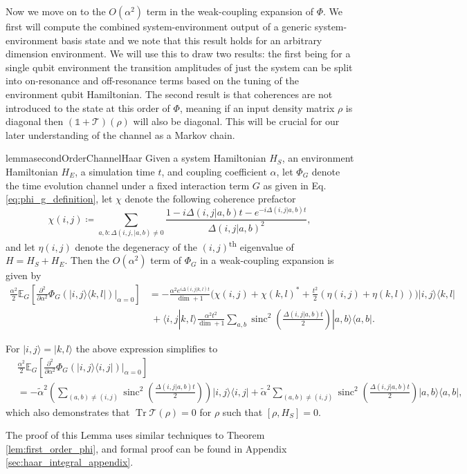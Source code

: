 \documentclass{article}
\newcommand{\ket}[1]{|#1\rangle}
\newcommand{\braket}[2]{\langle #1|#2\rangle}
\newcommand{\ketbra}[2]{| #1\rangle\! \langle #2|}
\newcommand{\ts}{\textsuperscript}
\DeclareMathOperator{\Tr}{Tr}
\newcommand{\identity}{\mathds{1}}
\DeclareMathOperator{\sinc}{sinc}
\begin{document}
Now we move on to the $O(\alpha^2)$ term in the weak-coupling expansion of $\Phi$. We first will compute the combined system-environment output of a generic system-environment basis state and we note that this result holds for an arbitrary dimension environment. We will use this to draw two results:  the first being for a single qubit environment the transition amplitudes of just the system can be split into on-resonance and off-resonance terms based on the tuning of the environment qubit Hamiltonian. The second result is that coherences are not introduced to the state at this order of $\Phi$, meaning if an input density matrix $\rho$ is diagonal then $(\identity + \mathcal{T})(\rho)$ will also be diagonal. This will be crucial for our later understanding of the channel as a Markov chain.
\begin{restatable}{lemma}{secondOrderChannelHaar} \label{lem:big_one}
    Given a system Hamiltonian $H_{S}$, an environment Hamiltonian $H_{E}$, a simulation time $t$, and coupling coefficient $\alpha$, let $\Phi_G$ denote the time evolution channel under a fixed interaction term $G$ as given in Eq. \eqref{eq:phi_g_definition}, let $\chi$ denote the following coherence prefactor
$$ \chi(i,j) \coloneqq \sum_{a,b: \Delta(i,j,|a,b) \neq 0} \frac{1 - i \Delta(i,j|a,b)t - e^{-i \Delta(i,j|a,b) t}}{\Delta(i,j|a,b)^2}, $$
and let $\eta(i,j)$ denote the degeneracy of the $(i,j)$\ts{th} eigenvalue of $H = H_S + H_E$. Then the $O(\alpha^2)$ term of $\Phi_G$ in a weak-coupling expansion is given by
 \begin{align}
 \frac{\alpha^2}{2} \mathbb{E}_G \left[ \frac{\partial^2}{\partial \alpha^2} \Phi_G(\ketbra{i,j}{k,l}) \big|_{\alpha = 0} \right] &= -\frac{\alpha^2  e^{i \Delta(i,j|k,l) t}}{\dim + 1} \bigg(\chi(i,j) + \chi(k,l)^*  + \frac{t^2}{2}(\eta(i,j) + \eta(k,l)) \bigg) \ketbra{i,j}{k,l} \nonumber \\
    &~ + \braket{i,j}{k,l}  \frac{\alpha^2 t^2}{\dim+1} \sum_{a,b} \sinc^2 \left( \frac{\Delta(i,j|a,b)t}{2} \right) \ketbra{a,b}{a,b}.  \label{eq:el_gigante}
 \end{align}

 For $\ket{i, j} = \ket{k, l}$ the above expression simplifies to
 \begin{align}
     &\frac{\alpha^2}{2} \mathbb{E}_G \left[ \frac{\partial^2}{\partial \alpha^2} \Phi_G(\ketbra{i,j}{i,j}) \big|_{\alpha = 0} \right] \nonumber \\
     &=  - \widetilde{\alpha}^2 \left(\sum_{(a,b) \neq (i,j)} \sinc^2 \left(\frac{\Delta(i,j | a,b)t}{2} \right) \right) \ketbra{i, j}{i,j} + \widetilde{\alpha}^2 \sum_{(a,b) \neq (i,j)} \sinc^2 \left(\frac{\Delta(i,j | a,b)t}{2} \right) \ketbra{a, b}{a,b} ,\label{eq:el_gigante_dos}
 \end{align}
 which also demonstrates that $\Tr \mathcal{T}(\rho) = 0$ for $\rho$ such that $[\rho, H_S] = 0$.
\end{restatable}
\noindent The proof of this Lemma uses similar techniques to Theorem \ref{lem:first_order_phi}, and formal proof can be found in Appendix \ref{sec:haar_integral_appendix}.
\end{document}
